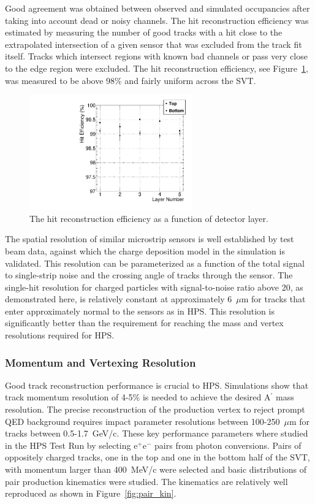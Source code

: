 \documentclass[final,3p,times,twocolumn]{elsarticle}
\newcommand{\Aprime}{A\ensuremath{^\prime}}
\newcommand{\ee}{e$^+$e$^-$}
\begin{document}
Good agreement was obtained between observed and simulated occupancies after taking into account 
dead or noisy channels. The hit reconstruction efficiency was estimated by measuring 
the number of good tracks with a hit close to the extrapolated intersection of a given sensor that was 
excluded from the track fit itself. Tracks which intersect regions with known bad channels or pass very 
close to the edge region were excluded. The hit reconstruction efficiency, see Figure~\ref{fig:hit_efficiency}, 
was measured to be above 98\% and fairly uniform across the SVT. 
\begin{figure}[]
\begin{center}
\includegraphics[width=7cm]{single_hit_efficiency.pdf}
\caption{\small The hit reconstruction efficiency as a function of detector layer.
\label{fig:hit_efficiency}}
\end{center}
\end{figure}


The spatial resolution of similar microstrip sensors is well established by test beam data, against which 
the charge deposition model in the simulation is validated.  This resolution can be parameterized as a 
function of the total signal to single-strip noise and the crossing angle of tracks through the sensor.  
The single-hit resolution for charged particles with signal-to-noise ratio above 20, as demonstrated 
here, is relatively constant at approximately 6~$\mu$m for tracks that enter approximately normal to 
the sensors as in HPS. This resolution is significantly better than the requirement for reaching the mass 
and vertex resolutions required for HPS.



\subsubsection{Momentum and Vertexing Resolution}
Good track reconstruction performance is crucial to HPS. Simulations show that track momentum resolution 
of 4-5\% is needed to achieve the desired \Aprime{} mass resolution. The precise reconstruction of the 
production vertex to reject prompt QED background requires impact parameter resolutions between 
100-250~$\mu$m for tracks between 0.5-1.7~GeV/c. These key performance parameters where studied 
in the HPS Test Run by selecting \ee{} pairs from photon conversions. Pairs of oppositely charged tracks, 
one in the top and one in the bottom half of the SVT, with momentum larger than 400~MeV/c were selected 
and basic distributions of pair production kinematics were studied.
The kinematics are relatively well reproduced as shown in Figure~\ref{fig:pair_kin}. 
\end{document}
